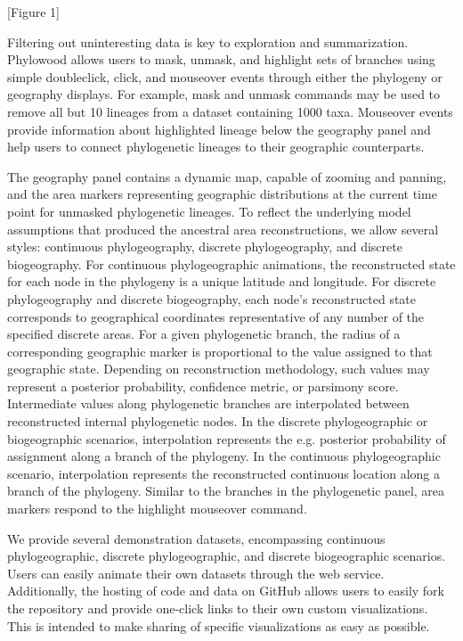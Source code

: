 \documentclass[11pt]{article}
\begin{document}
\begin{center}
[Figure 1]
\end{center}

Filtering out uninteresting data is key to exploration and summarization. Phylowood allows users to mask, unmask, and highlight sets of branches using simple doubleclick, click, and mouseover events through either the phylogeny or geography displays. For example, mask and unmask commands may be used to remove all but 10 lineages from a dataset containing 1000 taxa. Mouseover events provide information about highlighted lineage below the geography panel and help users to connect phylogenetic lineages to their geographic counterparts.

The geography panel contains a dynamic map, capable of zooming and panning, and the area markers representing geographic distributions at the current time point for unmasked phylogenetic lineages. To reflect the underlying model assumptions that produced the ancestral area reconstructions, we allow several styles: continuous phylogeography, discrete phylogeography, and discrete biogeography. For continuous phylogeographic animations, the reconstructed state for each node in the phylogeny is a unique latitude and longitude. For discrete phylogeography and discrete biogeography, each node's reconstructed state corresponds to geographical coordinates representative of any number of the specified discrete areas. For a given phylogenetic branch, the radius of a corresponding geographic marker is proportional to the value assigned to that geographic state. Depending on reconstruction methodology, such values may represent a posterior probability, confidence metric, or parsimony score. Intermediate values along phylogenetic branches are interpolated between reconstructed internal phylogenetic nodes. In the discrete phylogeographic or biogeographic scenarios, interpolation represents the e.g. posterior probability of assignment along a branch of the phylogeny. In the continuous phylogeographic scenario, interpolation represents the reconstructed continuous location along a branch of the phylogeny. Similar to the branches in the phylogenetic panel, area markers respond to the highlight mouseover command.

We provide several demonstration datasets, encompassing continuous phylogeographic, discrete phylogeographic, and discrete biogeographic scenarios. Users can easily animate their own datasets through the web service. Additionally, the hosting of code and data on GitHub allows users to easily fork the repository and provide one-click links to their own custom visualizations. This is intended to make sharing of specific visualizations as easy as possible.
\end{document}
